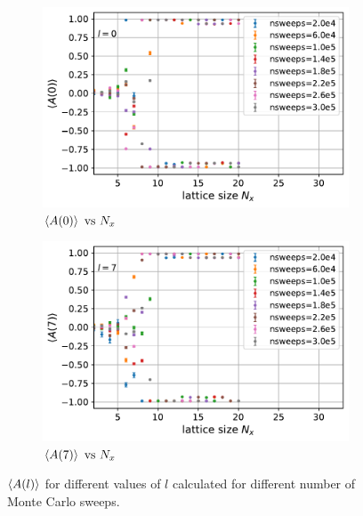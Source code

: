 \documentclass[../thesis_main.tex]{subfiles}
\begin{document}
\begin{figure}[!htb]
    \centering
    \begin{subfigure}[b]{0.47\textwidth}
        \centering
        \includegraphics[width=\textwidth]{images/expval(A_l)_vs_N_x/A vs N_x (l=0).pdf}
        \caption{$\expval{A(0)} \text{ vs } N_x$}
    \end{subfigure}
    \hspace{1em}  %
    \begin{subfigure}[b]{0.47\textwidth}
        \centering
        \includegraphics[width=\textwidth]{images/expval(A_l)_vs_N_x/A vs N_x (l=7).pdf}
        \caption{$\expval{A(7)} \text{ vs } N_x$}
    \end{subfigure}
    \caption{$\expval{A(l)}$ for different values of $l$ calculated for different number of Monte Carlo sweeps.}
\end{figure}
\end{document}
